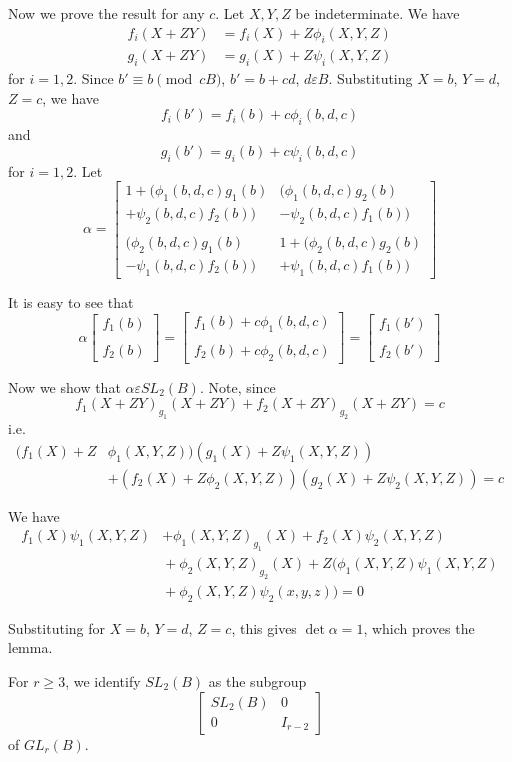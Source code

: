 \begin{Proof}
Now we prove the result for any $c$. Let $X,Y,Z$ be indeterminate. We
have
\begin{align*}
f_i(X+ZY)&=f_i(X)+Z\phi_i(X,Y,Z)\\
g_i(X+ZY)&=g_i(X)+Z\psi_i(X,Y,Z)
\end{align*}
for $i=1,2$. Since $b'\equiv b\pmod{cB}$, $b'=b+cd$, $d\varepsilon
B$. Substituting $X=b$, $Y=d$, $Z=c$, we have 
$$
f_i(b')=f_i(b)+c\phi_i(b,d,c)
$$
and
$$
g_i(b')=g_i(b)+c\psi_i(b,d,c)
$$
for $i=1,2$. Let
$$
\alpha=
\begin{bmatrix}
1+(\phi_1(b,d,c)g_1(b) & (\phi_1(b,d,c)g_2(b)\\
 +\psi_2(b,d,c)f_2(b)) &  -\psi_2(b,d,c)f_1(b))\\
& \\
(\phi_2(b,d,c)g_1(b) & 1+(\phi_2(b,d,c)g_2(b)\\
 -\psi_1(b,d,c)f_2(b)) & +\psi_1(b,d,c)f_1(b))
\end{bmatrix}
$$

It is easy to see that
$$
\alpha
\begin{bmatrix}
f_1(b)\\
\\
f_2(b)
\end{bmatrix} = \begin{bmatrix}
f_1(b)+c\phi_1(b,d,c)\\
\\
f_2(b)+c\phi_2(b,d,c)
\end{bmatrix} = \begin{bmatrix}
f_1(b')\\
\\
f_2(b')
\end{bmatrix}
$$

Now we show that $\alpha\varepsilon SL_2(B)$. Note, since
$$
f_1(X+ZY)_{g_1}(X+ZY)+f_2(X+ZY)_{g_2}(X+ZY)=c
$$
i.e.
$$
\begin{aligned}
(f_1(X)+Z&\phi_1(X,Y,Z))(g_1(X)+Z\psi_1(X,Y,Z))\\
&+(f_2(X)+Z\phi_2(X,Y,Z))(g_2(X)+Z\psi_2(X,Y,Z))=c
\end{aligned}
$$

We have
$$
\begin{aligned}
f_1(X)\psi_1(X,Y,Z)&+\phi_1(X,Y,Z)_{g_1}(X)+f_2(X)\psi_2(X,Y,Z)\\
&{}+\phi_2(X,Y,Z)_{g_2}(X)+Z(\phi_1(X,Y,Z)\psi_1(X,Y,Z)\\
&{}+\phi_2(X,Y,Z)\psi_2(x,y,z))=0
\end{aligned}
$$

Substituting for $X=b$, $Y=d$, $Z=c$, this gives $\det \alpha=1$,
which proves the lemma.

For $r\geq 3$, we identify $SL_2(B)$ as the subgroup
$$
\begin{bmatrix}
SL_2(B) & 0\\
0 & I_{r-2}
\end{bmatrix}
$$
of $GL_r(B)$.
\enprf
\end{Proof}


